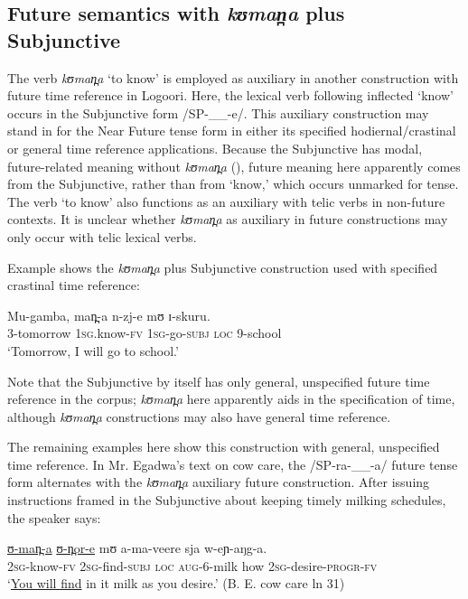 \documentclass[output=paper]{langsci/langscibook}
\begin{document}
\subsection{Future semantics with \textit{k}\textit{ʊman̪a}\textit{ }plus Subjunctive} \label{sec:sarvasy:7.3}

The verb \textit{kʊman̪a }‘to know’ is employed as auxiliary in another construction with future time reference in Logoori. Here, the lexical verb following inflected ‘know’ occurs in the Subjunctive form /SP-\_\_-e/. This auxiliary construction may stand in for the Near Future tense form in either its specified hodiernal/crastinal or general time reference applications. Because the Subjunctive has modal, future-related meaning without \textit{kʊman̪a} (), future meaning here apparently comes from the Subjunctive, rather than from ‘know,’ which occurs unmarked for tense. The verb ‘to know’ also functions as an auxiliary with telic verbs in non-future contexts. It is unclear whether \textit{kʊman̪a }as auxiliary in future constructions may only occur with telic lexical verbs.

Example  shows the \textit{kʊman̪a }plus Subjunctive construction used with specified crastinal time reference:

\ea\label{ex:sarvasy:20}
\gll Mu-gamba,   man̪-a    n-zj-e    mʊ  ɪ{}-skuru. \\
3-tomorrow  \textsc{1sg.}know-\textsc{fv}  \textsc{1sg}{}-go-\textsc{subj}  \textsc{loc}  9-school \\
\glt ‘Tomorrow, I will go to school.’
\z

Note that the Subjunctive by itself has only general, unspecified future time reference in the corpus; \textit{kʊman̪a }here apparently aids in the specification of time, although \textit{kʊman̪a }constructions may also have general time reference. 

The remaining examples here show this construction with general, unspecified time reference. In Mr. Egadwa’s text on cow care, the /SP-ra-\_\_-a/ future tense form alternates with the \textit{kʊman̪a }auxiliary future construction. After issuing instructions framed in the Subjunctive about keeping timely milking schedules, the speaker says: 

\ea\label{ex:sarvasy:21}
\gll \underline{ʊ{}-man̪-a}   \underline{ʊ{}-n̪or-e}     mʊ   a-ma-veere   sja   w-eɲ-aŋg-a. \\
\textsc{2sg-}know-\textsc{fv}  \textsc{2sg}{}-find-\textsc{subj}  \textsc{loc}  \textsc{aug-}6-milk  how  \textsc{2sg}{}-desire-\textsc{progr}{}-\textsc{fv} \\
\glt ‘\underline{You will find} in it milk as you desire.’ (B. E. cow care ln 31)
\z
\end{document}
